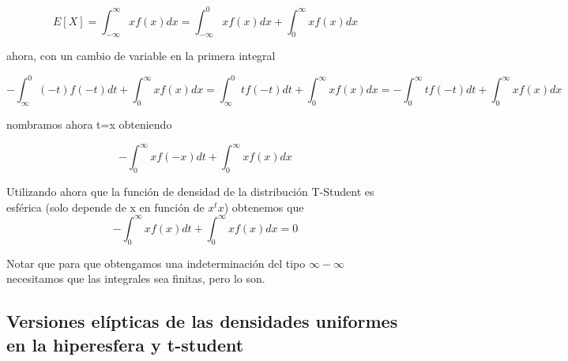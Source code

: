 \documentclass{article}
\theoremstyle{theorem-style}  %
\theoremstyle{definition}
\theoremstyle{example-style}
\begin{document}
	\[
		E[X] = \int_{-\infty}^{\infty} x f(x) dx = \int_{-\infty}^{0} x f(x) dx + \int_{0}^{\infty} x f(x) dx 
	\]
	
	ahora, con un cambio de variable en la primera integral
	
	\[
		- \int_{\infty}^{0} (-t) f(-t) dt + \int_{0}^{\infty} x f(x) dx  = \int_{\infty}^{0} t f(-t) dt + \int_{0}^{\infty} x f(x) dx = 
		- \int_{0}^{\infty} t f(-t) dt + \int_{0}^{\infty} x f(x) dx 
	\]
	
	nombramos ahora t=x obteniendo
	
	\[
	- \int_{0}^{\infty} x f(-x) dt + \int_{0}^{\infty} x f(x) dx 
	\]
	
	Utilizando ahora que la función de densidad de la distribución T-Student es esférica (solo depende de x en función de $x^t x$) obtenemos que 
	\[
		- \int_{0}^{\infty} x f(x) dt + \int_{0}^{\infty} x f(x) dx = 0
	\]
	
	Notar que para que obtengamos una indeterminación del tipo $\infty - \infty$ necesitamos que las integrales sea finitas, pero lo son.
	
		
	
	\subsection{Versiones elípticas de las densidades uniformes en la hiperesfera y t-student}
	
\end{document}
